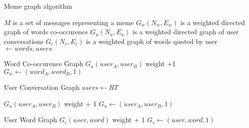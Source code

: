 \begin{algorithm}[H]
    \caption{Meme graph algorithm}
    \label{algo:meme-graph}
    \begin{algorithmic}

        \Require $M$ is a set of messages representing a meme
        \State $G_w(N_w,E_w)$ is a weighted directed graph of words co-occurence
        \State $G_u(N_u,E_u)$ is a weighted directed graph of user conversations
        \State $G_c(N_c,E_c)$ is a weighted graph of words quoted by user
        \\
                \State {}  $ \gets words, users$

                \Comment Word Co-occurence Graph
                        \State $G_u(user_A,user_B)$ weight +1
                    \Else
                        \State $G_w \gets (word_A,word_B, 1)$
                    \EndIf

                \EndFor

                \Comment User Conversation Graph
                    \State $users \gets RT$
                \EndIf

                        \State $G_u(user_A,user_B)$ weight + 1
                    \Else
                        \State $G_u \gets (user_A,user_B, 1)$
                    \EndIf
                \EndFor

                \Comment User Word Graph
                        \State $G_c(user,word)$ weight + 1
                    \Else
                        \State $G_c \gets (user,word,1)$
                    \EndIf
                \EndFor

            \EndFor
        \EndFunction

    \end{algorithmic}
\end{algorithm}